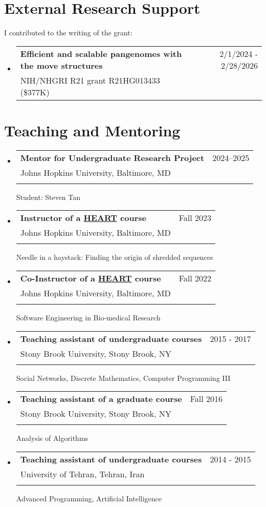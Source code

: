 \documentclass[A4,11pt]{article}
\makeatletter
\newcommand{\CVSubheading}[4]{
  \vspace{-2pt}\item
    \begin{tabular*}{0.97\textwidth}[t]{l@{\extracolsep{\fill}}r}
      \textbf{#1} & #2 \\
      \small#3 & \small #4 \\
    \end{tabular*}\vspace{-7pt}
}
\newcommand{\CVSubHeadingListStart}{\begin{itemize}[leftmargin=0.5cm, label={}]}
\newcommand{\CVSubHeadingListEnd}{\end{itemize}}
\makeatother
\begin{document}
\section{External Research Support}
  I contributed to the writing of the grant:\\
  \CVSubHeadingListStart
  \CVSubheading
  {Efficient and scalable pangenomes with the move structures} {2/1/2024 - 2/28/2026}
  {NIH/NHGRI R21 grant R21HG013433 (\$377K)}{}
  \CVSubHeadingListEnd

\begin{comment}
    Section is here as it applied to my application for positions in academia. 
    Remember to tailor the resume for to the position.
\end{comment}
    \section{Teaching and Mentoring}
      \CVSubHeadingListStart
      \CVSubheading
      {Mentor for Undergraduate Research Project}{2024--2025}
      {Johns Hopkins University, Baltimore, MD}\\
      {Student: Steven Tan}{}
      \CVSubheading
      {Instructor of a \href{https://engineering.jhu.edu/education/undergraduate-studies/heart-heroic-courses/}{HEART} course}{Fall 2023}
      {Johns Hopkins University, Baltimore, MD}\\
      {Needle in a haystack: Finding the origin of shredded sequences}
    
      \CVSubheading
      {Co-Instructor of a \href{https://engineering.jhu.edu/education/undergraduate-studies/heart-heroic-courses/}{HEART} course}{Fall 2022}
      {Johns Hopkins University, Baltimore, MD}\\
      {Software Engineering in Bio-medical Research}
    
      \CVSubheading
          {Teaching assistant of undergraduate courses}{2015 - 2017}
          {Stony Brook University, Stony Brook, NY} \\
          {Social Networks, Discrete Mathematics, Computer Programming III}
        \CVSubheading
          {Teaching assistant of a graduate course}{Fall 2016}
          {Stony Brook University, Stony Brook, NY}\\
          {Analysis of Algorithms}
        \CVSubheading
          {Teaching assistant of undergraduate courses}{2014 - 2015}
          {University of Tehran, Tehran, Iran}\\
          {Advanced Programming, Artificial Intelligence}
        \CVSubHeadingListEnd
      
\end{document}
